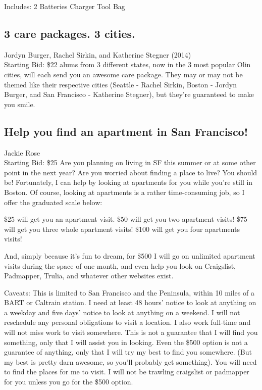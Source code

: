 \documentclass[11pt]{article}
\begin{document}
Includes:
2 Batteries
Charger
Tool Bag
\subsection{3 care packages. 3 cities.}
Jordyn Burger, Rachel Sirkin, and Katherine Stegner (2014)
\\
Starting Bid: \$22
 alums from 3 different states, now in the 3 most popular Olin cities, will each send you an awesome care package. They may or may not be themed like their respective cities (Seattle - Rachel Sirkin, Boston - Jordyn Burger, and San Francisco - Katherine Stegner), but they're guaranteed to make you smile.
\subsection{Help you find an apartment in San Francisco!}
Jackie Rose
\\
Starting Bid: \$25
\newline
Are you planning on living in SF this summer or at some other point in the next year? Are you worried about finding a place to live? You should be! Fortunately, I can help by looking at apartments for you while you're still in Boston. Of course, looking at apartments is a rather time-consuming job, so I offer the graduated scale below:

\$25 will get you an apartment visit.
\$50 will get you two apartment visits!
\$75 will get you three whole apartment visits!
\$100 will get you four apartments visits!

And, simply because it's fun to dream, for \$500 I will go on unlimited apartment visits during the space of one month, and even help you look on Craigslist, Padmapper, Trulia, and whatever other websites exist.

Caveats:
This is limited to San Francisco and the Peninsula, within 10 miles of a BART or Caltrain station.
I need at least 48 hours' notice to look at anything on a weekday and five days' notice to look at anything on a weekend. I will not reschedule any personal obligations to visit a location. I also work full-time and will not miss work to visit somewhere.
This is not a guarantee that I will find you something, only that I will assist you in looking. Even the \$500 option is not a guarantee of anything, only that I will try my best to find you somewhere. (But my best is pretty darn awesome, so you'll probably get something).
You will need to find the places for me to visit. I will not be trawling craigslist or padmapper for you unless you go for the \$500 option.
\end{document}
